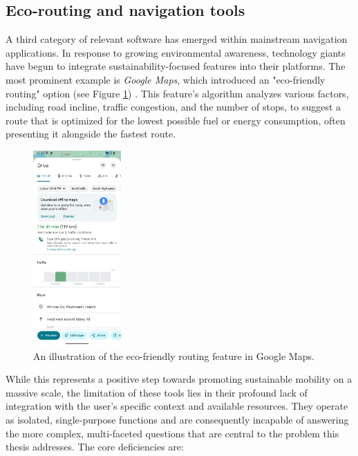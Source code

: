 \subsection{Eco-routing and navigation tools}
A third category of relevant software has emerged within mainstream navigation applications. In response to growing environmental awareness, technology giants have begun to integrate sustainability-focused features into their platforms. The most prominent example is \textit{Google Maps}, which introduced an "eco-friendly routing" option (see Figure \ref{fig:google-maps-ecorouting}) . This feature's algorithm analyzes various factors, including road incline, traffic congestion, and the number of stops, to suggest a route that is optimized for the lowest possible fuel or energy consumption, often presenting it alongside the fastest route.

\begin{figure}[H]
    \centering
    \includegraphics[width=0.3\textwidth]{images/background/google-maps-ecorouting.png}
    \caption{An illustration of the eco-friendly routing feature in Google Maps.}
    \label{fig:google-maps-ecorouting}
\end{figure}

\textgap

While this represents a positive step towards promoting sustainable mobility on a massive scale, the limitation of these tools lies in their profound lack of integration with the user's specific context and available resources. They operate as isolated, single-purpose functions and are consequently incapable of answering the more complex, multi-faceted questions that are central to the problem this thesis addresses. The core deficiencies are:

